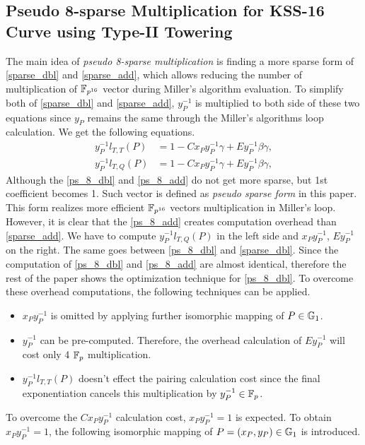 \subsection{Pseudo 8-sparse Multiplication for KSS-16 Curve using Type-II Towering}
The main idea of  \textit{pseudo 8-sparse multiplication} is finding a more sparse form  of \eqref{sparse_dbl} and \eqref{sparse_add}, which allows reducing the number of multiplication of $\mathbb{F}_{p^{16}}$ vector during Miller's algorithm evaluation. 
To simplify both of \eqref{sparse_dbl} and \eqref{sparse_add}, $y_P^{-1}$ is multiplied to both side of  these two equations since $y_P$  remains the same through the Miller's algorithms loop calculation.
We get the following equations.
\begin{subequations}
	\begin{eqnarray}
	y_{P}^{-1}l_{T,T}(P)& =  1 -Cx_{P}y_{P}^{-1}\gamma+E y_{P}^{-1}\beta\gamma ,  \label{ps_8_dbl}\\
	y_{P}^{-1}l_{T,Q}(P)& =  1 -Cx_{P}y_{P}^{-1}\gamma+E y_{P}^{-1}\beta\gamma , \label{ps_8_add}
	\end{eqnarray}
\end{subequations}
Although the \eqref{ps_8_dbl} and \eqref{ps_8_add} do not get more sparse, but 1st coefficient becomes 1. 
Such vector is defined as \textit{pseudo sparse form} in this paper. 
This form realizes more efficient $\mathbb{F}_{p^{16}}$ vectors  multiplication in Miller's loop.  
However, it is clear that the \eqref{ps_8_add} creates computation overhead than \eqref{sparse_add}. We have to compute $y_{P}^{-1}l_{T,Q}(P)$ in the left side and $x_Py_{P}^{-1}$, $Ey_P^{-1}$ on the right. 
The same goes between \eqref{ps_8_dbl} and \eqref{sparse_dbl}. 
Since the computation of \eqref{ps_8_dbl} and \eqref{ps_8_add} are almost identical, therefore the rest of the paper shows the optimization technique for \eqref{ps_8_dbl}.
To overcome these overhead computations, the following techniques can be applied.
\begin{itemize}
	\item $x_{P}y_{P}^{-1}$ is omitted by applying further isomorphic mapping of $P \in {\mathbb{G}}_{1}$.
	\item  $y_P^{-1} $ can be pre-computed. Therefore, the overhead calculation of $Ey_P^{-1}$ will cost only 4 ${\mathbb{F}}_{p}$ multiplication.
	\item  $y_{P}^{-1}l_{T,T}(P)$  doesn't effect the pairing calculation cost since the final exponentiation cancels this multiplication by $y_{P}^{-1} \in {\mathbb{F}}_{p}$.
\end{itemize}
To overcome the $Cx_{P}y_{P}^{-1}$  calculation cost, $x_{P}y_{P}^{-1} =1 $ is expected. 
To obtain $x_{P}y_{P}^{-1} = 1$, the following isomorphic mapping of $P=(x_P,y_P) \in {\mathbb{G}}_{1}$ is introduced. 

